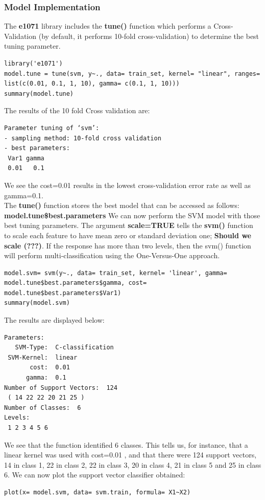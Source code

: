 \documentclass[]{report}
\begin{document}
\subsubsection{Model Implementation}
The \textbf{e1071} library includes the \textbf{tune()} function which performs a Cross-Validation (by default, it performs 10-fold cross-validation) to determine the best tuning parameter.
\begin{lstlisting}
library('e1071')
model.tune = tune(svm, y~., data= train_set, kernel= "linear", ranges= list(c(0.01, 0.1, 1, 10), gamma= c(0.1, 1, 10)))
summary(model.tune)
\end{lstlisting}
The results of the 10 fold Cross validation are:
\begin{verbatim}
Parameter tuning of ‘svm’:
- sampling method: 10-fold cross validation 
- best parameters:
 Var1 gamma
 0.01   0.1
\end{verbatim}
We see the cost=0.01 results in the lowest cross-validation error rate as well as gamma=0.1.\\
The \textbf{tune()} function stores the best model that can be accessed as follows: \textbf{model.tune\$best.parameters} We can now perform the SVM model with those best tuning parameters.
The argument \textbf{scale=TRUE} tells the \textbf{svm()} function to scale each feature to have mean zero or standard deviation one;\textbf{ Should we scale (???)}. If the response has more than two levels, then the svm() function will perform multi-classification using the One-Versus-One approach.
\begin{lstlisting}
model.svm= svm(y~., data= train_set, kernel= 'linear', gamma= model.tune$best.parameters$gamma, cost= model.tune$best.parameters$Var1)
summary(model.svm)
\end{lstlisting}
The results are displayed below:
\begin{verbatim}
Parameters:
   SVM-Type:  C-classification 
 SVM-Kernel:  linear 
       cost:  0.01 
      gamma:  0.1 
Number of Support Vectors:  124
 ( 14 22 22 20 21 25 )
Number of Classes:  6 
Levels: 
 1 2 3 4 5 6
\end{verbatim}
We see that the function identified 6 classes. This tells us, for instance, that a linear kernel was used with cost=0.01 , and that there were 124 support vectors, 14 in class 1, 22 in class 2, 22 in class 3, 20 in class 4, 21 in class 5 and 25 in class 6. 
We can now plot the support vector classifier obtained:
\begin{lstlisting}
plot(x= model.svm, data= svm.train, formula= X1~X2)
\end{lstlisting}
\end{document}
